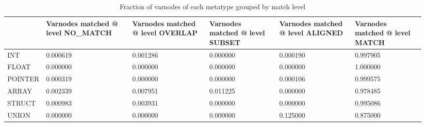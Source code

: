 \begin{table}[t]
\centering
\caption{Fraction of varnodes of each metatype grouped by match level}
\label{table:metatype-match-levels-ratios}
\begin{tabular}{lp{3.6cm}p{3.6cm}p{3.6cm}p{3.6cm}p{3.6cm}}
\toprule
{} &  Varnodes matched @ level NO\_MATCH &  Varnodes matched @ level OVERLAP &  Varnodes matched @ level SUBSET &  Varnodes matched @ level ALIGNED &  Varnodes matched @ level MATCH \\
\midrule
INT     &                           0.000619 &                          0.001286 &                         0.000000 &                          0.000190 &                        0.997905 \\
FLOAT   &                           0.000000 &                          0.000000 &                         0.000000 &                          0.000000 &                        1.000000 \\
POINTER &                           0.000319 &                          0.000000 &                         0.000000 &                          0.000106 &                        0.999575 \\
ARRAY   &                           0.002339 &                          0.007951 &                         0.011225 &                          0.000000 &                        0.978485 \\
STRUCT  &                           0.000983 &                          0.003931 &                         0.000000 &                          0.000000 &                        0.995086 \\
UNION   &                           0.000000 &                          0.000000 &                         0.000000 &                          0.125000 &                        0.875000 \\
\bottomrule
\end{tabular}
\end{table}
